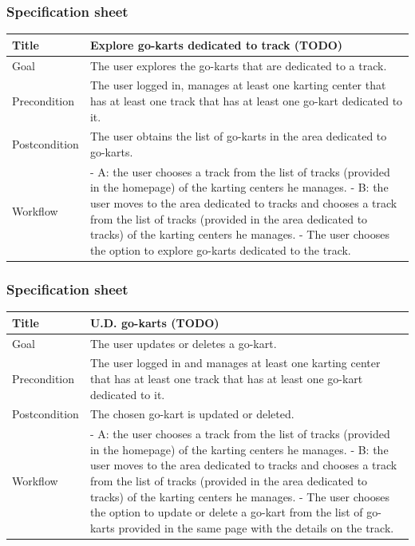 \documentclass{beamer}
\begin{document}
\begin{frame}
    \frametitle{Specification sheet}
    \begin{table}
        \tiny
        \begin{tabular}{|p{2cm}|p{6cm}|}
        \hline  
        Title & \textbf{Explore go-karts dedicated to track (TODO)} \\
        \hline
        Goal & The user explores the go-karts that are dedicated to a track. \\
        \hline
        Precondition & The user logged in, manages at least one karting center that has at least
        one track that has at least one go-kart dedicated to it.\\
        \hline
        Postcondition & The user obtains the list of go-karts in the area dedicated to go-karts. \\
        \hline
        Workflow &
        - A: the user chooses a track from the list of tracks (provided in the homepage) 
        of the karting centers
        he manages. \newline
        - B: the user moves to the area dedicated to tracks and chooses a track from the list of tracks
        (provided in the area dedicated to tracks) of the karting centers he manages. \newline
        - The user chooses the option to explore go-karts dedicated to the track. \\
        \hline
        \end{tabular}
\end{table}
\end{frame}


\begin{frame}
    \frametitle{Specification sheet}
    \begin{table}
        \tiny
        \begin{tabular}{|p{2cm}|p{6cm}|}
        \hline  
        Title & \textbf{U.D. go-karts (TODO)} \\
        \hline
        Goal & The user updates or deletes a go-kart. \\
        \hline
        Precondition & The user logged in and manages at least one karting center that has at least
        one track that has at least one go-kart dedicated to it. \\
        \hline
        Postcondition & The chosen go-kart is updated or deleted. \\
        \hline
        Workflow &
        - A: the user chooses a track from the list of tracks (provided in the homepage) 
        of the karting centers
        he manages. \newline
        - B: the user moves to the area dedicated to tracks and chooses a track from the list of tracks
        (provided in the area dedicated to tracks) of the karting centers he manages. \newline
        - The user chooses the option to update or delete a go-kart from the list of go-karts
        provided in the same page with the details on the track. \\
        \hline
        \end{tabular}
\end{table}
\end{frame}
\end{document}
